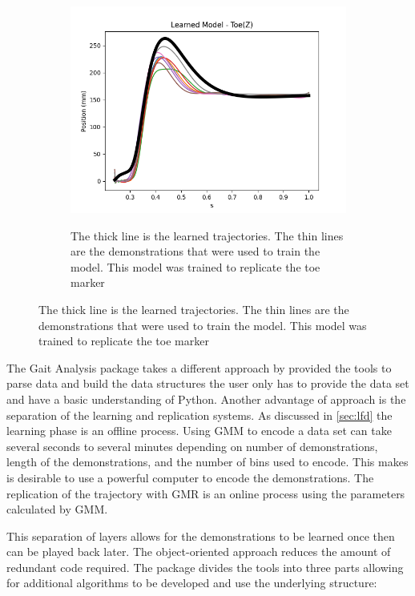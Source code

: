 \begin{figure}
\begin{subfigure}{0.4\linewidth}
{        \includegraphics[scale=0.50]{images/software/learnedZ.png}}
        \caption{The thick line is the learned trajectories. The thin lines are the demonstrations that were used to train the model. This model was trained to replicate the toe marker}
        \label{fig:learned}
    \end{subfigure}
    
    \label{fig:my_label}
\end{figure}




The Gait Analysis package takes a different approach by provided the tools to parse data and build the data structures the user only has to provide the data set and have a basic understanding of Python. Another advantage of approach is the separation of the learning and replication systems. As discussed in \autoref{sec:lfd} the learning phase is an offline process. Using GMM to encode a data set can take several seconds to several minutes depending on number of demonstrations, length of the demonstrations, and the number of bins used to encode. This makes is desirable to use a powerful computer to encode the demonstrations. The replication of the trajectory with GMR is an online process using the parameters calculated by GMM. 

This separation of layers allows for the demonstrations to be learned once then can be played back later. The object-oriented approach reduces the amount of redundant code required. The package divides the tools into three parts allowing for additional algorithms to be developed and use the underlying structure: 

